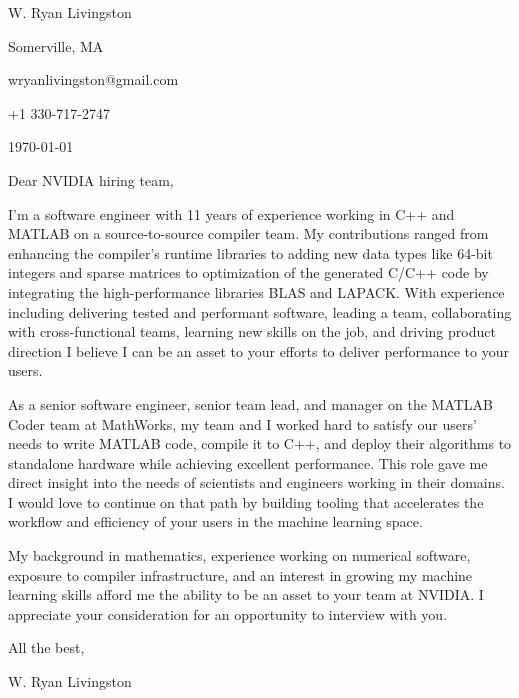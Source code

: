 \documentclass[
    10pt %
]{article}
\begin{document}
\begin{minipage}{\linewidth}
W. Ryan Livingston

Somerville, MA

wryanlivingston@gmail.com

+1 330-717-2747

\today
\end{minipage}


Dear NVIDIA hiring team,

I'm a software engineer with 11 years of experience working in C++ and MATLAB on a source-to-source compiler team. My contributions ranged from enhancing the compiler's runtime libraries to adding new data types like 64-bit integers and sparse matrices to optimization of the generated C/C++ code by integrating the high-performance libraries BLAS and LAPACK. With experience including delivering tested and performant software, leading a team, collaborating with cross-functional teams, learning new skills on the job, and driving product direction I believe I can be an asset to your efforts to deliver performance to your users.

As a senior software engineer, senior team lead, and manager on the MATLAB Coder team at MathWorks, my team and I worked hard to satisfy our users' needs to write MATLAB code, compile it to C++, and deploy their algorithms to standalone hardware while achieving excellent performance. This role gave me direct insight into the needs of scientists and engineers working in their domains. I would love to continue on that path by building tooling that accelerates the workflow and efficiency of your users in the machine learning space.

My background in mathematics, experience working on numerical software, exposure to compiler infrastructure, and an interest in growing my machine learning skills afford me the ability to be an asset to your team at NVIDIA. I appreciate your consideration for an opportunity to interview with you.

All the best,

W. Ryan Livingston
\end{document}
